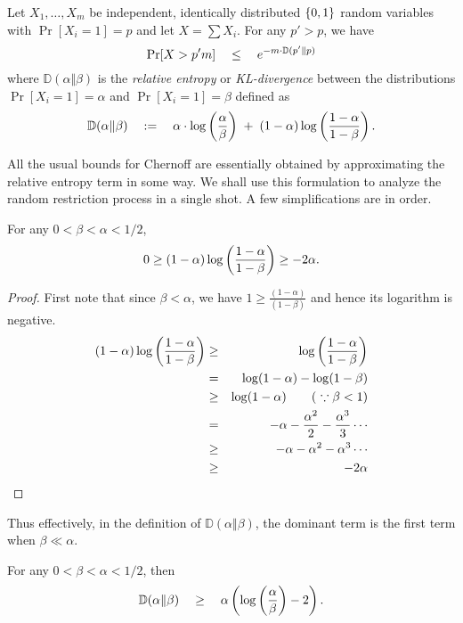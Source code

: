 \begin{lemma}\label{lem:chernoff-stronger}
Let $X_1,\ldots, X_m$ be independent, identically distributed $\left\{0,1\right\}$ random variables with $\Pr[X_i = 1] = p$ and let $X = \sum X_i$. For any $p' > p$, we have
\[
\Pr[X >p' m] \quad \leq \quad e^{-m \cdot \mathbb{D}(p' \Vert p)}
\]
where $\mathbb{D}(\alpha \Vert \beta)$ is the \emph{relative entropy} or \emph{KL-divergence} between the distributions $\Pr[X_i=1] = \alpha$ and $\Pr[X_i=1]=\beta$ defined as
\[
\mathbb{D}(\alpha \Vert \beta) \quad := \quad \alpha \cdot \log \left(\frac{\alpha}{\beta}\right) \;+\; (1 - \alpha) \log \left(\frac{1-\alpha}{1- \beta}\right).
\]
\end{lemma}

All the usual bounds for Chernoff are essentially obtained by approximating the relative entropy term in some way. We shall use this formulation to analyze the random restriction process in a single shot. A few simplifications are in order. 

\begin{claim}\label{stronger-chernoff-secondterm}
For any $0 < \beta < \alpha < 1/2$, 
\[
0 \geq (1 - \alpha) \log\left(\frac{1 - \alpha}{1 - \beta}\right) \geq -2\alpha. 
\]
\end{claim}
\begin{proof}
First note that since $\beta < \alpha$, we have $1 \geq \frac{(1-\alpha)}{(1-\beta)}$ and hence its logarithm is negative. 
\begin{eqnarray*}
(1 - \alpha) \log\left(\frac{1 - \alpha}{1 - \beta}\right) & \geq & \log\left(\frac{1 - \alpha}{1 - \beta}\right)\\
& = & \log(1 - \alpha) - \log (1-\beta)\\
& \geq & \log(1 - \alpha)\qquad(\text{ $\because \beta < 1$})\\
& = & - \alpha - \frac{\alpha^2}{2} - \frac{\alpha^3}{3} \cdots \\
& \geq & - \alpha - \alpha^2 - \alpha^3 \cdots\\
& \geq & -2\alpha\qedhere
\end{eqnarray*}
\end{proof}
Thus effectively, in the definition of $\mathbb{D}(\alpha \Vert \beta)$, the dominant term is the first term when $\beta \ll \alpha$. 

\begin{corollary}
For any $0 < \beta < \alpha < 1/2$, then
\[
\mathbb{D}(\alpha\Vert \beta)  \quad \geq \quad  \alpha \left(\log\left(\frac{\alpha}{\beta}\right) - 2\right).
\]
\end{corollary}

